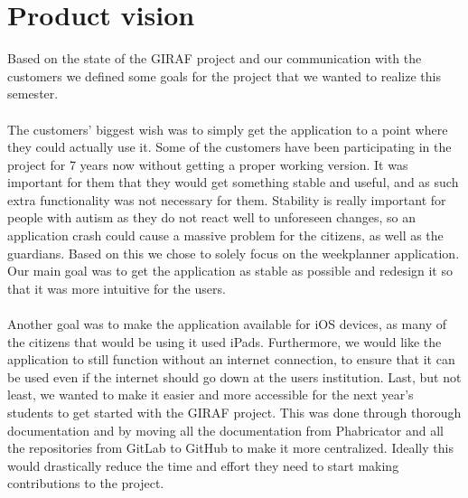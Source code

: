 \section{Product vision}\label{sec:introduction-product-vision}
Based on the state of the GIRAF project and our communication with the customers we defined some goals for the project that we wanted to realize this semester.
\\\\
The customers' biggest wish was to simply get the application to a point where they could actually use it.
Some of the customers have been participating in the project for 7 years now without getting a proper working version.
It was important for them that they would get something stable and useful, and as such extra functionality was not necessary for them.
Stability is really important for people with autism as they do not react well to unforeseen changes, so an application crash could cause a massive problem for the citizens, as well as the guardians.
Based on this we chose to solely focus on the weekplanner application.
Our main goal was to get the application as stable as possible and redesign it so that it was more intuitive for the users.
\\\\
Another goal was to make the application available for iOS devices, as many of the citizens that would be using it used iPads.
Furthermore, we would like the application to still function without an internet connection, to ensure that it can be used even if the internet should go down at the users institution.
Last, but not least, we wanted to make it easier and more accessible for the next year's students to get started with the GIRAF project.
This was done through thorough documentation and by moving all the documentation from Phabricator and all the repositories from GitLab to GitHub to make it more centralized.
Ideally this would drastically reduce the time and effort they need to start making contributions to the project.
